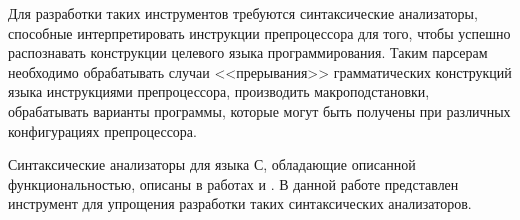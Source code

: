 Для разработки таких инструментов требуются синтаксические анализаторы, способные интерпретировать инструкции препроцессора для того, чтобы успешно распознавать конструкции целевого языка программирования. Таким парсерам необходимо обрабатывать случаи <<прерывания>> грамматических конструкций языка инструкциями препроцессора, производить макроподстановки, обрабатывать варианты программы, которые могут быть получены при различных конфигурациях препроцессора.

Синтаксические анализаторы для языка С, обладающие описанной функциональностью, описаны в работах \cite{superc} и \cite{typechef}. В данной работе представлен инструмент для упрощения разработки таких синтаксических анализаторов. 
